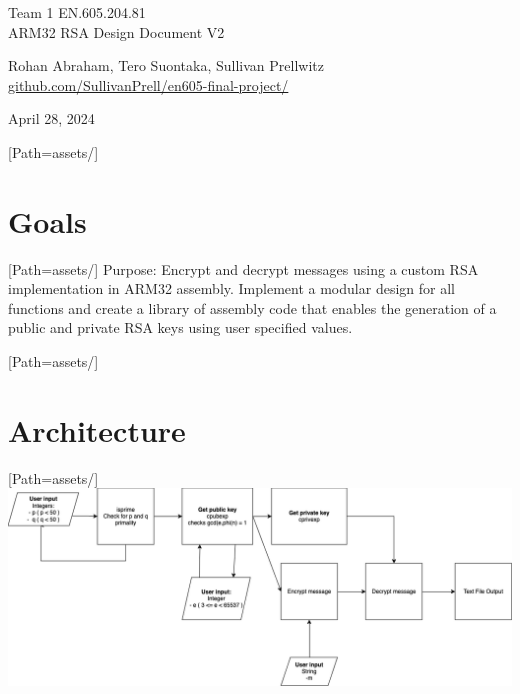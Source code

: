 \documentclass{article}
\begin{document}
\begin{titlepage}

\begin{flushright}

\vspace{7.5cm}

\Huge Team 1 EN.605.204.81 \\ ARM32 RSA Design Document V2

\vspace{0.5cm}

\Large Rohan Abraham, Tero Suontaka, Sullivan Prellwitz
\Large {\href{https://github.com/SullivanPrell/en605-final-project/}{github.com/SullivanPrell/en605-final-project/}}
\vspace{8cm}

\normalsize April 28, 2024
\end{flushright}
\end{titlepage}
\newpage
\tableofcontents
\newpage
\setmainfont{OpenSans-VariableFont_wdth,wght.ttf}[Path=assets/]
\section{Goals}
\setmainfont{OpenSans-VariableFont_wdth,wght.ttf}[Path=assets/]
Purpose: Encrypt and decrypt messages using a custom RSA implementation in ARM32 assembly.
Implement a modular design for all functions and create a library of assembly code that enables the generation of a public and private RSA keys using user specified values.
\newpage

\setmainfont{OpenSans-VariableFont_wdth,wght.ttf}[Path=assets/]
\section{Architecture}
\setmainfont{OpenSans-VariableFont_wdth,wght.ttf}[Path=assets/]
\includegraphics[scale=0.44]{assets/rsa-impl.drawio.png}
\end{document}
